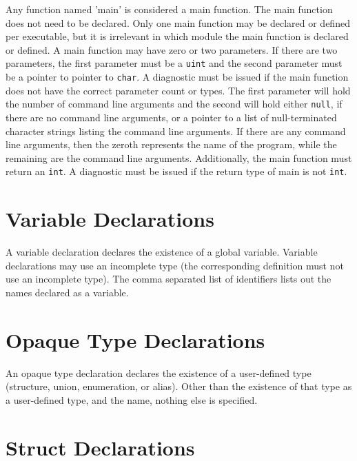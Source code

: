 \documentclass[letterpaper,12pt]{book}
\begin{document}
Any function named 'main' is considered a main function. The main function does not need to be declared. Only one main function may be declared or defined per executable, but it is irrelevant in which module the main function is declared or defined. A main function may have zero or two parameters. If there are two parameters, the first parameter must be a \texttt{uint} and the second parameter must be a pointer to pointer to \texttt{char}. A diagnostic must be issued if the main function does not have the correct parameter count or types. The first parameter will hold the number of command line arguments and the second will hold either \texttt{null}, if there are no command line arguments, or a pointer to a list of null-terminated character strings listing the command line arguments. If there are any command line arguments, then the zeroth represents the name of the program, while the remaining are the command line arguments. Additionally, the main function must return an \texttt{int}. A diagnostic must be issued if the return type of main is not \texttt{int}.

\section{Variable Declarations}



A variable declaration declares the existence of a global variable. Variable declarations may use an incomplete type (the corresponding definition must not use an incomplete type). The comma separated list of identifiers lists out the names declared as a variable.

\section{Opaque Type Declarations}



An opaque type declaration declares the existence of a user-defined type (structure, union, enumeration, or alias). Other than the existence of that type as a user-defined type, and the name, nothing else is specified.

\section{Struct Declarations}
\end{document}
